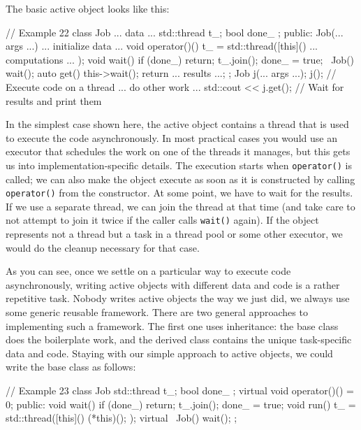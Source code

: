 The basic active object looks like this:

\begin{code}
// Example 22
class Job {
  ... data ...
  std::thread t_;
  bool done_ {};
  public:
  Job(... args ...) { ... initialize data ... }
  void operator()() {
    t_ = std::thread([this](){ ... computations ... }
  );
  }
  void wait() {
    if (done_) return;
    t_.join();
    done_ = true;
  }
  ~Job() { wait(); }
  auto get() { this->wait(); return ... results ...; }
};
Job j(... args ...);
j();     // Execute code on a thread
... do other work ...
std::cout << j.get();  // Wait for results and print them
\end{code}

In the simplest case shown here, the active object contains a thread that is used to execute the code asynchronously. In most practical cases you would use an executor that schedules the work on one of the threads it manages, but this gets us into implementation-specific details. The execution starts when \texttt{operator()} is called; we can also make the object execute as soon as it is constructed by calling \texttt{operator()} from the constructor. At some point, we have to wait for the results. If we use a separate thread, we can join the thread at that time (and take care to not attempt to join it twice if the caller calls \texttt{wait()} again). If the object represents not a thread but a task in a thread pool or some other executor, we would do the cleanup necessary for that case.

As you can see, once we settle on a particular way to execute code asynchronously, writing active objects with different data and code is a rather repetitive task. Nobody writes active objects the way we just did, we always use some generic reusable framework. There are two general approaches to implementing such a framework. The first one uses inheritance: the base class does the boilerplate work, and the derived class contains the unique task-specific data and code. Staying with our simple approach to active objects, we could write the base class as follows:

\begin{code}
// Example 23
class Job {
  std::thread t_;
  bool done_ {};
  virtual void operator()() = 0;
  public:
  void wait() {
    if (done_) return;
    t_.join();
    done_ = true;
  }
  void run() {
    t_ = std::thread([this](){ (*this)(); });
  }
  virtual ~Job() { wait(); }
};
\end{code}

